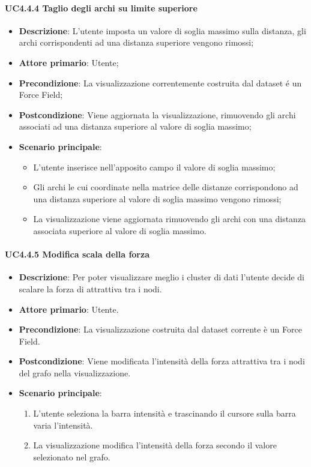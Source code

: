 \paragraph{UC4.4.4 Taglio degli archi su limite superiore}
\label{par:uc4.4.4}
\begin{itemize}
    \item \textbf{Descrizione}:     L'utente imposta un valore di soglia massimo sulla distanza, gli archi corrispondenti ad una distanza superiore vengono rimossi;
    \item \textbf{Attore primario}: Utente;
    \item \textbf{Precondizione}:   La visualizzazione correntemente costruita dal dataset é un Force Field;
    \item \textbf{Postcondizione}:  Viene aggiornata la visualizzazione, rimuovendo gli archi associati ad una distanza superiore al valore di soglia massimo;
    \item \textbf{Scenario principale}:
    \begin{itemize}
        \item L'utente inserisce nell'apposito campo il valore di soglia massimo;
        \item Gli archi le cui coordinate nella matrice delle distanze corrispondono ad una distanza superiore al valore di soglia massimo vengono rimossi;
        \item La visualizzazione viene aggiornata rimuovendo gli archi con una distanza associata superiore al valore di soglia massimo.
    \end{itemize}
\end{itemize}

\paragraph{UC4.4.5 Modifica scala della forza}
\label{par:uc4.4.5}
\begin{itemize}
    \item \textbf{Descrizione}: Per poter visualizzare meglio i cluster di dati l’utente 
                                decide di scalare la forza di attrattiva tra i nodi.

	
    \item \textbf{Attore primario}: Utente.
    
    \item \textbf{Precondizione}:   La visualizzazione costruita dal dataset corrente è un Force Field.
    \item \textbf{Postcondizione}:  Viene modificata l'intensità della forza attrattiva tra i nodi del grafo nella visualizzazione.

	\item \textbf{Scenario principale}:
        \begin{enumerate}
            \item L'utente seleziona la barra intensità e trascinando il cursore sulla barra varia l’intensità.
            \item La visualizzazione modifica l'intensità della forza secondo il valore selezionato nel grafo.
        \end{enumerate}
\end{itemize}

